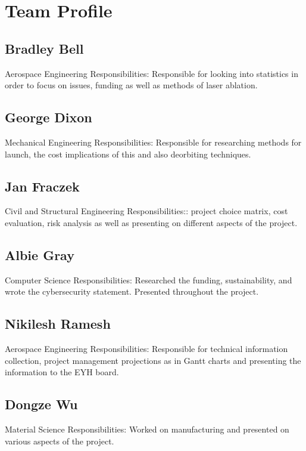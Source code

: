 \documentclass{article}
\begin{document}
\section{Team Profile}
\subsection{Bradley Bell}
Aerospace Engineering
Responsibilities: Responsible for looking into statistics in order to focus on issues, funding as well as methods of laser ablation.


\subsection{George Dixon}
Mechanical Engineering
Responsibilities: Responsible for researching methods for launch, the cost implications of this and also deorbiting techniques.




\subsection{Jan Fraczek}
Civil and Structural Engineering
Responsibilities:: project choice matrix, cost evaluation, risk analysis as well as presenting on different aspects of the project.


\subsection{Albie Gray}
Computer Science
Responsibilities: Researched the funding, sustainability, and wrote the cybersecurity statement. Presented throughout the project.


\subsection{Nikilesh Ramesh}
Aerospace Engineering
Responsibilities: Responsible for technical information collection, project management projections as in Gantt charts and presenting the information to the EYH board.

\subsection{Dongze Wu}
Material Science
Responsibilities: Worked on manufacturing and presented on various aspects of the project.

\printbibliography
\end{document}
